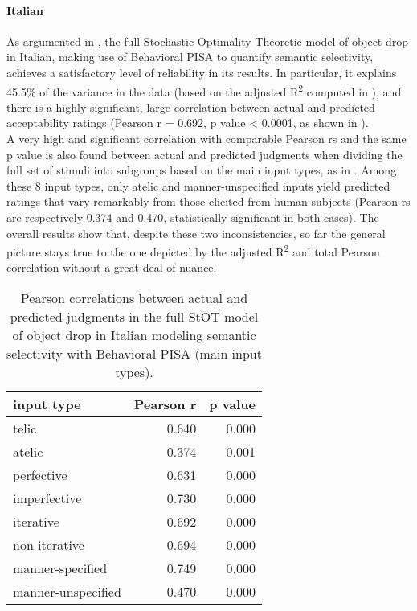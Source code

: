 \paragraph{Italian} 
As argumented in , the full Stochastic Optimality Theoretic model of object drop in Italian, making use of Behavioral PISA to quantify semantic selectivity, achieves a satisfactory level of reliability in its results. In particular, it explains 45.5\% of the variance in the data (based on the adjusted R\textsuperscript{2} computed in ), and there is a highly significant, large correlation between actual and predicted acceptability ratings (Pearson r = 0.692, p value < 0.0001, as shown in ).\\
A very high and significant correlation with comparable Pearson rs and the same p value is also found between actual and predicted judgments when dividing the full set of stimuli into subgroups based on the main input types, as in . Among these 8 input types, only atelic and manner-unspecified inputs yield predicted ratings that vary remarkably from those elicited from human subjects (Pearson rs are respectively 0.374 and 0.470, statistically significant in both cases). The overall results show that, despite these two inconsistencies, so far the general picture stays true to the one depicted by the adjusted R\textsuperscript{2} and total Pearson correlation without a great deal of nuance.

\begin{table}[htb] %
\caption{Pearson correlations between actual and predicted judgments in the full StOT model of object drop in Italian modeling semantic selectivity with Behavioral PISA (main input types).}
\begin{tabular}{l|rr}
\textbf{input type} & \textbf{Pearson r} & \textbf{p value} \\
\hline
telic               & 0.640 & 0.000 \\
atelic              & 0.374 & 0.001 \\
perfective          & 0.631 & 0.000 \\
imperfective        & 0.730 & 0.000 \\
iterative           & 0.692 & 0.000 \\
non-iterative       & 0.694 & 0.000 \\
manner-specified    & 0.749 & 0.000 \\
manner-unspecified  & 0.470 & 0.000
\end{tabular}
\end{table}

